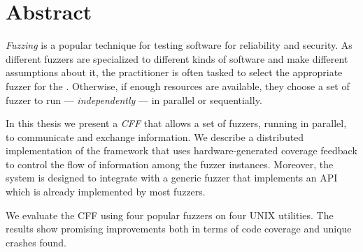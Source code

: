\begingroup%
\let\clearpage\relax%
\let\cleardoublepage\relax%
\let\cleardoublepage\relax%

\chapter*{Abstract}

\emph{Fuzzing} is a popular technique for testing software for reliability and
security. As different fuzzers are specialized to different kinds of software
and make different assumptions about it, the practitioner is often tasked to
select the appropriate fuzzer for the \sut. Otherwise, if enough resources are
available, they choose a set of fuzzer to run --- \emph{independently} --- in
parallel or sequentially.

In this thesis we present a \emph{\ac{CFF}} that allows a set of fuzzers,
running in parallel, to communicate and exchange information. We describe a
distributed implementation of the framework that uses hardware-generated
coverage feedback to control the flow of information among the fuzzer instances.
Moreover, the system is designed to integrate with a generic fuzzer that
implements an \acs{API} which is already implemented by most fuzzers.

We evaluate the \ac{CFF} using four popular fuzzers on four UNIX utilities. The
results show promising improvements both in terms of code coverage and unique
crashes found.

\endgroup%

\vfill%

